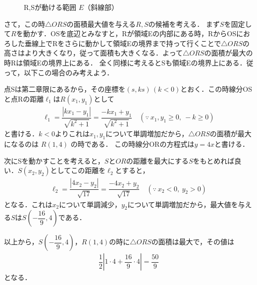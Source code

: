 \documentclass[../../main.tex]{subfiles}
\begin{document}
\begin{figure}[htb]
\begin{center}
  \end{center}
  \caption{R,Sが動ける範囲 $E$（斜線部）}
\end{figure}

さて，この時$\triangle ORS$の面積最大値を与える$R,S$の候補を考える．
まず$S$を固定して$R$を動かす．OSを底辺とみなすと，Rが領域Eの内部にある時，RからOSにおろした垂線上でRをさらに動かして領域Eの境界まで持って行くことで$\triangle ORS$の高さはより大きくなり，従って面積も大きくなる．よって$\triangle ORS$の面積が最大の時Rは領域Eの境界上にある．
全く同様に考えるとSも領域Eの境界上にある．従って，以下この場合のみ考えよう．

点Sは第二章限にあるから，その座標を$(s, ks)\, (k < 0)$とおく．この時線分OSと点Rの距離$\ell_1$は$R(x_1,y_1)$として
\begin{align}
  \ell_1=\dfrac{|kx_1-y_1|}{\sqrt{k^2+1}}=\dfrac{-kx_1+y_1}{\sqrt{k^2+1}} \quad (\because\ x_1,y_1\ge0,\ -k\ge0) \label{eq:4}
\end{align}
と書ける．$k<0$よりこれは$x_1,y_1$について単調増加だから，$\triangle ORS$の面積が最大になるのは $R(1,4)$ の時である．
この時線分ORの方程式は$y=4x$と書ける．

次にSを動かすことを考えると，$S$と$OR$の距離を最大にする$S$をもとめれば良い．$S(x_2,y_2)$としてこの距離を$\ell_2$とすると，
\begin{align}
  \ell_2=\dfrac{|4x_2-y_2|}{\sqrt{17}}=\dfrac{-4x_2+y_2}{\sqrt{17}} \quad (\because\ x_2<0,\ y_2>0)
\end{align}
となる．これは$x_2$について単調減少，$y_2$について単調増加だから，最大値を与える$S$は$S\left(-\dfrac{16}{9},4\right)$である．

以上から，$S\left(-\dfrac{16}{9},4\right)$，$R(1,4)$の時に$\triangle ORS$の面積は最大で，その値は
\begin{align}
  \dfrac{1}{2}\left|1\cdot4+\dfrac{16}{9}\cdot4\right|=\dfrac{50}{9}
\end{align}
となる．

\newpage
\end{document}

